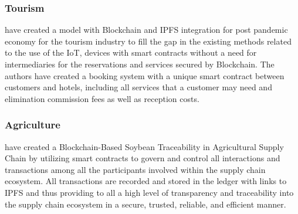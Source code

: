 \subsubsection{Tourism}
\cite{demirel2021smart} have created a model with Blockchain and \ac{IPFS} integration for post pandemic economy for the tourism industry to fill the gap in the existing methods related to the use of the \ac{IoT}, devices with smart contracts without a need for intermediaries for the reservations and services secured by Blockchain. The authors have created a booking system with a unique smart contract between customers and hotels, including all services that a customer may need and elimination commission fees as well as reception costs.


\subsubsection{Agriculture}
\cite{8718621} have created a Blockchain-Based Soybean Traceability in Agricultural Supply Chain by  utilizing smart contracts to govern and control all interactions and transactions among all the participants involved within the supply chain ecosystem. All transactions are recorded and stored in the ledger with links to \ac{IPFS} and thus providing to all a high level of transparency and traceability into the supply chain ecosystem in a secure, trusted, reliable, and efficient manner.